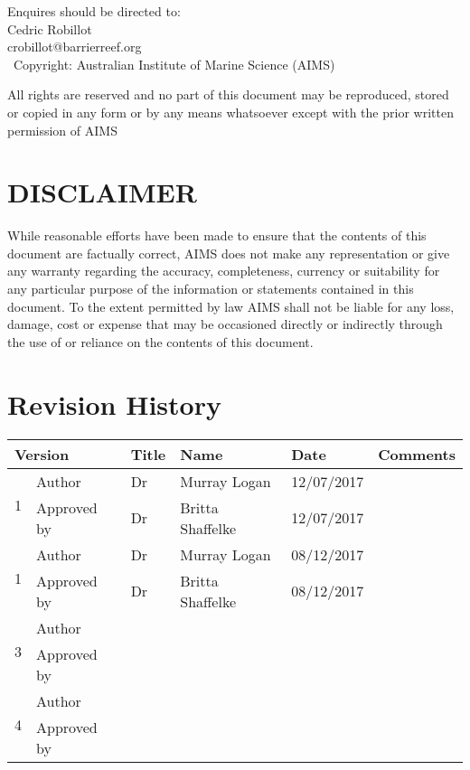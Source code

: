 Enquires should be directed to:\\[1em]
Cedric Robillot\\
crobillot@barrierreef.org  \\[2em]

\textcopyright~Copyright: Australian Institute of Marine Science (AIMS) \the\year

All rights are reserved and no part of this document may be reproduced, stored or copied in any form or by any means whatsoever except with the prior written permission of AIMS


\part*{DISCLAIMER}
While reasonable efforts have been made to ensure that the contents of this document are factually correct, AIMS does not make any representation or give any warranty regarding the accuracy, completeness, currency or suitability for any particular purpose of the information or statements contained in this document. To the extent permitted by law AIMS shall not be liable for any loss, damage, cost or expense that may be occasioned directly or indirectly through the use of or reliance on the contents of this document.


\part*{Revision History}

\begin{tabular}{|l|l|l|p{4cm}|p{4cm}|p{3cm}|}
\hline
\multicolumn{2}{|l|}{Version} & Title & Name & Date & Comments\\
\hline
\multirow{2}{*}{1} & Author &Dr&Murray Logan&12/07/2017&\\
\cline{2-6}
 & Approved by & Dr&Britta Shaffelke&12/07/2017&\\
  \hline
\multirow{2}{*}{1} & Author &Dr&Murray Logan&08/12/2017&\\
\cline{2-6}
 & Approved by &Dr&Britta Shaffelke&08/12/2017&\\
\hline  
\multirow{2}{*}{3} & Author &&&&\\
\cline{2-6}
 & Approved by & &&&\\
\hline
\multirow{2}{*}{4} & Author &&&&\\
\cline{2-6}
 & Approved by & &&&\\
\hline

\end{tabular}

\newpage

\tableofcontents
\newpage
\listoffigures
\newpage
\listoftables
\newpage
